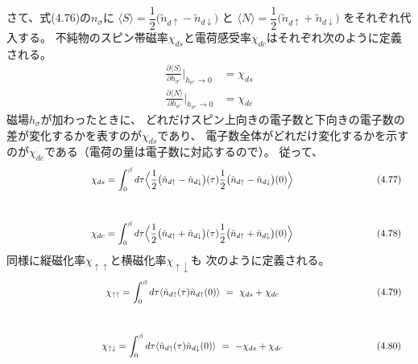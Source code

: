 \documentclass[a4j]{jarticle}
\begin{document}
さて、式(4.76)の$n_{\sigma}$に
$
	\langle S \rangle
	=
	\dfrac{1}{2}
	\big(
	\tilde{n}_{d \uparrow} - \tilde{n}_{d \downarrow}
	\big)
$
と
$
	\langle N \rangle
	=
	\dfrac{1}{2}
	\big(
	\tilde{n}_{d \uparrow} + \tilde{n}_{d \downarrow}
	\big)
$
をそれぞれ代入する。
不純物のスピン帯磁率$\chi_{ds}$と電荷感受率$\chi_{dc}$はそれぞれ次のように定義される。
\begin{align}
	\frac{
		\partial
		\langle S \rangle
	}{
		\partial
		h_{\sigma'}
	}
	\bigg|_{h_{\sigma'} \to 0}
	 & =
	\chi_{ds}
	\\
	\frac{
		\partial
		\langle N \rangle
	}{
		\partial
		h_{\sigma'}
	}
	\bigg|_{h_{\sigma'} \to 0}
	 & =
	\chi_{dc}
\end{align}
磁場$h_{\sigma}$が加わったときに、
どれだけスピン上向きの電子数と下向きの電子数の差が変化するかを表すのが$\chi_{ds}$であり、
電子数全体がどれだけ変化するかを示すのが$\chi_{dc}$である（電荷の量は電子数に対応するので）。
従って、
\begin{align}
	\hspace{30.7mm}
	\chi_{ds}
	 & =
	\int^{\beta}_{0}d \tau
	\Big\langle
	\dfrac{1}{2}
	\big(
	\tilde{n}_{d \uparrow} - \tilde{n}_{d \downarrow}
	\big)(\tau)
	\dfrac{1}{2}
	\big(
	\tilde{n}_{d \uparrow} - \tilde{n}_{d \downarrow}
	\big)(0)
	\Big\rangle
	\nonumber
	\hspace{30.7mm}
	(4.77)
\end{align}
\\[-12mm]
\begin{align}
	\hspace{30.7mm}
	\chi_{dc}
	 & =
	\int^{\beta}_{0}d \tau
	\Big\langle
	\dfrac{1}{2}
	\big(
	\tilde{n}_{d \uparrow} + \tilde{n}_{d \downarrow}
	\big)(\tau)
	\dfrac{1}{2}
	\big(
	\tilde{n}_{d \uparrow} + \tilde{n}_{d \downarrow}
	\big)(0)
	\Big\rangle
	\nonumber
	\hspace{30.7mm}
	(4.78)
\end{align}
同様に縦磁化率$\chi_{\uparrow \uparrow}$と横磁化率$\chi_{\uparrow \downarrow}$も
次のように定義される。
\begin{align}
	\hspace{36mm}
	\chi_{\uparrow \uparrow}
	 & =
	\int^{\beta}_{0}d \tau
	\langle
	\tilde{n}_{d \uparrow}(\tau)
	\tilde{n}_{d \uparrow}(0)
	\rangle
	\ = \
	\chi_{ds} + \chi_{dc}
	\nonumber
	\hspace{36mm}
	(4.79)
\end{align}
\\[-12mm]
\begin{align}
	\hspace{34.7mm}
	\chi_{\uparrow \downarrow}
	 & =
	\int^{\beta}_{0}d \tau
	\langle
	\tilde{n}_{d \uparrow}(\tau)
	\tilde{n}_{d \downarrow}(0)
	\rangle
	\ = \
	- \chi_{ds} + \chi_{dc}
	\nonumber
	\hspace{34.7mm}
	(4.80)
\end{align}
\end{document}
